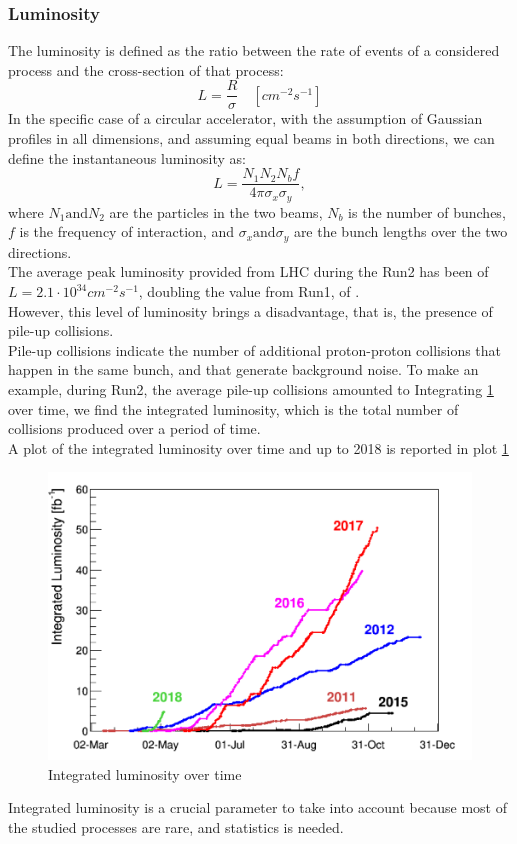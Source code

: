 \subsubsection{Luminosity}
The luminosity is defined as the ratio between the rate of events of a considered process and the cross-section of that process:
\begin{equation}
    L = \frac{R}{\sigma} \quad [cm^{-2}s^{-1}]
\end{equation}
In the specific case of a circular accelerator, with the assumption of Gaussian profiles in all dimensions, and assuming equal beams in both directions, we can define the instantaneous luminosity as:
\begin{equation}
    L = \dfrac{N_1N_2N_b f}{4\pi\sigma_x\sigma_y},
    \label{luminosity}
\end{equation}
where $N_1 \text{and} N_2$ are the particles in the two beams, $N_b$ is the number of bunches, $f$ is the frequency of interaction, and $\sigma_x \text{and} \sigma_y$ are the bunch lengths over the two directions.\\
The average peak luminosity provided from LHC during the Run2 has been of $L =  2.1 \cdot 10^{34} cm^{-2}s^{-1}$, doubling the value from Run1, of {}.\\ 
However, this level of luminosity brings a disadvantage, that is, the presence of pile-up collisions. \\
Pile-up collisions indicate the number of additional proton-proton collisions that happen in the same bunch, and that generate background noise. To make an example, during Run2, the average pile-up collisions amounted to  
Integrating \ref{luminosity} over time, we find the integrated luminosity, which is the total number of collisions produced over a period of time.\\
A plot of the integrated luminosity over time and up to 2018 is reported in plot \ref{luminosity}
\begin{figure}
    \centering
    \includegraphics[width= \textwidth]{images/luminosity.png}
    \caption{Integrated luminosity over time}
    \label{luminosity}
\end{figure}
Integrated luminosity is a crucial parameter to take into account because most of the studied processes are rare, and statistics is needed.\\

